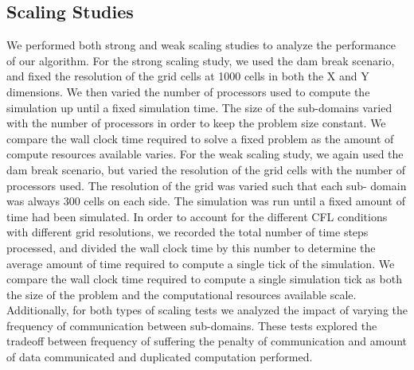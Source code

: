 \documentclass{article}
\begin{document}
\subsection{Scaling Studies}
We performed both strong and weak scaling studies to analyze the
performance of our algorithm. For the strong scaling study, we used the
dam break scenario, and fixed the resolution of the grid cells at 1000
cells in both the X and Y dimensions. We then varied the number of
processors used to compute the simulation up until a fixed simulation
time. The size of the sub-domains varied with the number of processors in
order to keep the problem size constant. We compare the wall clock time
required to solve a fixed problem as the amount of compute resources
available varies. For the weak scaling study, we again used the dam break
scenario, but varied the resolution of the grid cells with the number of
processors used. The resolution of the grid was varied such that each sub-
domain was always 300 cells on each side. The simulation was run until a
fixed amount of time had been simulated. In order to account for the
different CFL conditions with different grid resolutions, we recorded the
total number of time steps processed, and divided the wall clock time by
this number to determine the average amount of time required to compute a
single tick of the simulation. We compare the wall clock time required to
compute a single simulation tick as both the size of the problem and the
computational resources available scale. Additionally, for both types of
scaling tests we analyzed the impact of varying the frequency of
communication between sub-domains. These tests explored the tradeoff
between frequency of suffering the penalty of communication and amount
of data communicated and duplicated computation performed.
\end{document}
